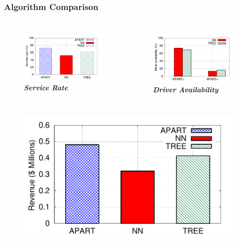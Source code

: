 \documentclass[t]{beamer}
\begin{document}
\begin{frame}\frametitle{Algorithm Comparison}
\begin{columns}
\vspace{-0.4in}
\begin{figure}
	\centering
    \includegraphics[width = 0.95\columnwidth]{default_sr}
    \vspace{-0.08in}
    \small{\textit{\textbf{Service Rate}}}
\end{figure}
\vspace{-0.4in}
\begin{figure}
	\centering
    \includegraphics[width = 0.95\columnwidth]{availability}
    \vspace{-0.08in}
    \small{\textit{\textbf{Driver Availability}}}
\end{figure}
\end{columns}
\begin{columns}
\vspace{-0.1in}
\begin{figure}
	\centering
    \includegraphics[width = 0.95\columnwidth]{default_rev}

\end{figure}
\end{columns}
\end{frame}
\end{document}
